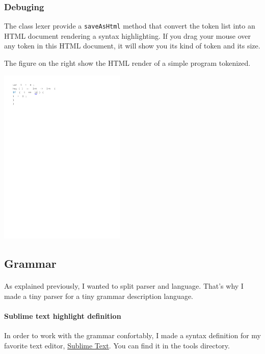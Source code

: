 \documentclass{article}
\newcommand\cc[1]{\texttt{#1}}
\begin{document}
			\subsubsection{Debuging}
				\begin{minipage}{0.6\textwidth}
				The class lexer provide a \cc{saveAsHtml} method that convert the token list into an HTML document rendering a syntax highlighting. If you drag your mouse over any token in this HTML document, it will show you its kind of token and its size.

				The figure on the right show the HTML render of a simple program tokenized. 
				\end{minipage}
				\hfill%
				\noindent\begin{minipage}{0.3\textwidth}
					\includegraphics[width=6cm]{pics/lexer_html_debug.pdf}
				\end{minipage}%
		\subsection{Grammar}
			\paragraph{} As explained previously, I wanted to split parser and language. That's why I made a tiny parser for a tiny grammar description language. 
			\paragraph{Sublime text highlight definition} In order to work with the grammar confortably, I made a syntax definition for my favorite text editor, \href{https://www.sublimetext.com/}{Sublime Text}. You can find it in the tools directory.
\end{document}
